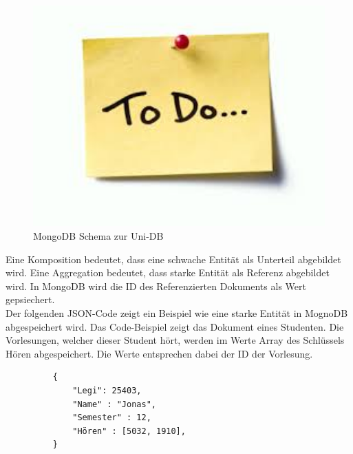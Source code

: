 \begin{figure}[h] 
	\centering
		\includegraphics[width=1\textwidth]{./pictures/todo.jpg}
	\caption{MongoDB Schema zur Uni-DB }
	\label{fig:uni-dbNoSQL}
\end{figure}
Eine Komposition bedeutet, dass eine schwache Entität als Unterteil abgebildet
wird. Eine Aggregation bedeutet, dass starke Entität  als Referenz abgebildet
wird. In MongoDB wird die ID des Referenzierten Dokuments als Wert gepsiechert.
\\
Der folgenden JSON-Code zeigt ein Beispiel wie eine starke Entität
in MognoDB abgespeichert wird. Das Code-Beispiel zeigt das Dokument eines
Studenten. Die Vorlesungen, welcher dieser Student hört, werden im Werte Array
des Schlüssels Hören abgespeichert. Die Werte entsprechen dabei der ID der
Vorlesung.
 \begin{figure} [h]
	\begin{verbatim}
	{
		"Legi": 25403,
		"Name" : "Jonas",
		"Semester" : 12,
		"Hören" : [5032, 1910],
	}
	\end{verbatim}
	\label{cod:vorlesung}
\end{figure}



